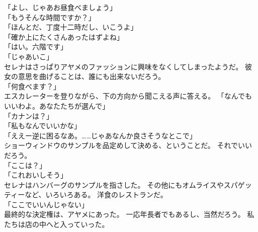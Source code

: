 \documentclass[../IHMain]{subfiles}
\begin{document}
「よし、じゃあお昼食べましょう」\\
「もうそんな時間ですか？」\\
「ほんとだ、丁度十二時だし、いこうよ」\\
「確か上にたくさんあったはずよね」\\
「はい。六階です」\\
「じゃあいこ」\\
セレナはさっぱりアヤメのファッションに興味をなくしてしまったようだ。
彼女の意思を曲げることは、誰にも出来ないだろう。\\
「何食べます？」\\
エスカレーターを登りながら、下の方向から聞こえる声に答える。
「なんでもいいわよ。あなたたちが選んで」\\
「カナンは？」\\
「私もなんでいいかな」\\
「ええー逆に困るなあ。……じゃあなんか良さそうなとこで」\\
ショーウィンドウのサンプルを品定めして決める、ということだ。
それでいいだろう。\\
「ここは？」\\
「これおいしそう」\\
セレナはハンバーグのサンプルを指さした。
その他にもオムライスやスパゲッティーなど、いろいろある。
洋食のレストランだ。\\
「ここでいいんじゃない」\\
最終的な決定権は、アヤメにあった。
一応年長者でもあるし、当然だろう。
私たちは店の中へと入っていった。
\end{document}
